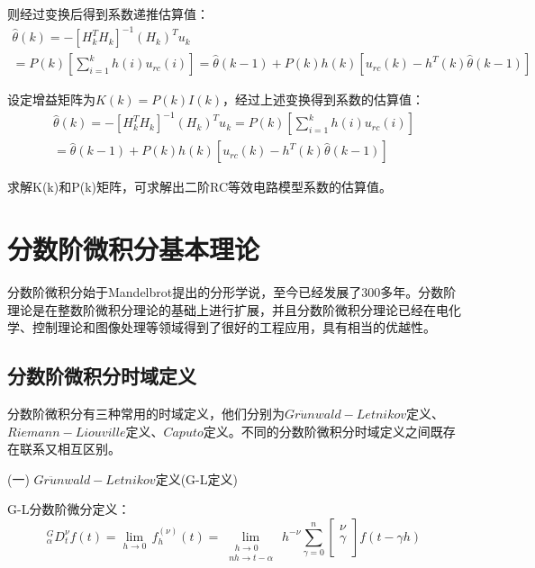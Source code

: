 则经过变换后得到系数递推估算值：
\begin{equation}
\begin{array}{l}
\widehat \theta (k) =  - {\left[ {H_k^T{H_k}} \right]^{ - 1}}{({H_k})^T}{u_k}\\
 = P(k)\left[ {\sum\limits_{i = 1}^k {h(i){u_{rc}}(i)} } \right] = \widehat \theta (k - 1) + P(k)h(k)\left[ {{u_{rc}}(k) - {h^T}(k)\widehat \theta (k - 1)} \right]
\end{array}
\end{equation}

设定增益矩阵为$K\left( k \right) = P\left( k \right)I\left( k \right)$，经过上述变换得到系数的估算值：
\begin{equation}
\begin{array}{l}
\widehat \theta (k) =  - {\left[ {H_k^T{H_k}} \right]^{ - 1}}{({H_k})^T}{u_k} = P(k)\left[ {\sum\limits_{i = 1}^k {h(i){u_{rc}}(i)} } \right]\\
 = \widehat \theta (k - 1) + P(k)h(k)\left[ {{u_{rc}}(k) - {h^T}(k)\widehat \theta (k - 1)} \right]
\end{array}
\end{equation}

 求解K(k)和P(k)矩阵，可求解出二阶RC等效电路模型系数的估算值。
\section{分数阶微积分基本理论}
分数阶微积分始于Mandelbrot提出的分形学说，至今已经发展了300多年。分数阶理论是在整数阶微积分理论的基础上进行扩展，并且分数阶微积分理论已经在电化学、控制理论和图像处理等领域得到了很好的工程应用，具有相当的优越性。
\subsection{分数阶微积分时域定义}
分数阶微积分有三种常用的时域定义，他们分别为$Gr\ddot{u}nwald-Letnikov$定义、$Riemann-Liouville$定义、$Caputo$定义。不同的分数阶微积分时域定义之间既存在联系又相互区别。

(一) $Gr\ddot{u}nwald-Letnikov$定义(G-L定义)

G-L分数阶微分定义：
\begin{equation}
{}_{\alpha }^{G}D_{t}^{\nu }f(t)=\underset{h\to 0}{\mathop{\lim }}\,f_{h}^{(\nu )}\left( t \right)=\underset{\begin{smallmatrix} 
 ~~~h\to 0 \\ 
 nh\to t-\alpha  
\end{smallmatrix}}{\mathop{\lim }}\,{{h}^{-\nu }}\sum\limits_{\gamma =0}^{n}{\left[ \begin{matrix}
   \nu   \\
   \gamma   \\
\end{matrix} \right]}f\left( t-\gamma h \right)
\end{equation}

